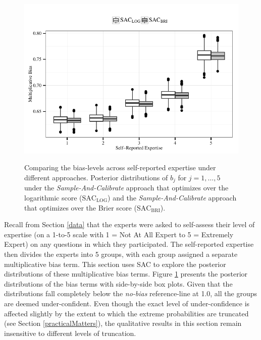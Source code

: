 \documentclass[aoas, preprint]{imsart}
\numberwithin{equation}{section}
\theoremstyle{plain}
\begin{document}
\begin{figure}[!ht]
\vspace*{-1em} 
\includegraphics[width = \textwidth]{Figures/BiasesBoxplots}
\label{BiasesLOGBoxplots}
\vspace*{-2em} 

\caption[Optional caption for list of figures]{Comparing the bias-levels across self-reported expertise under different approaches. 
Posterior distributions of $b_j$ for $j = 1, \dots, 5$ under the \textit{Sample-And-Calibrate} approach that optimizes over the logarithmic score ($\text{SAC}_{\text{LOG}}$) and the \textit{Sample-And-Calibrate} approach that optimizes over the Brier score ($\text{SAC}_{\text{BRI}}$).
}
\label{Biases}
\end{figure}


Recall from Section \ref{data} that the experts were asked to self-assess their level of expertise (on a 1-to-5 scale with 1 = Not At All Expert to 5 = Extremely Expert) on any questions in which they participated. The self-reported expertise then divides the experts into 5  groups, with each group assigned a separate multiplicative bias term. This section uses SAC to explore the posterior distributions of these multiplicative bias terms. Figure \ref{Biases} presents the posterior distributions of the bias terms with side-by-side box plots. Given that the distributions fall completely below the \textit{no-bias} reference-line at 1.0, all the groups are deemed under-confident. Even though the exact level of under-confidence is affected slightly by the extent to which the extreme probabilities are truncated (see Section \ref{practicalMatters}), the qualitative results in this section remain insensitive to different levels of truncation. 
\end{document}

